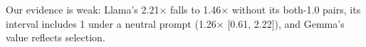Our evidence is weak: Llama's 2.21$\times$ falls to 1.46$\times$ without its both-1.0 pairs, its interval includes 1 under a neutral prompt (1.26$\times$ [0.61, 2.22]), and Gemma's value reflects selection.%
